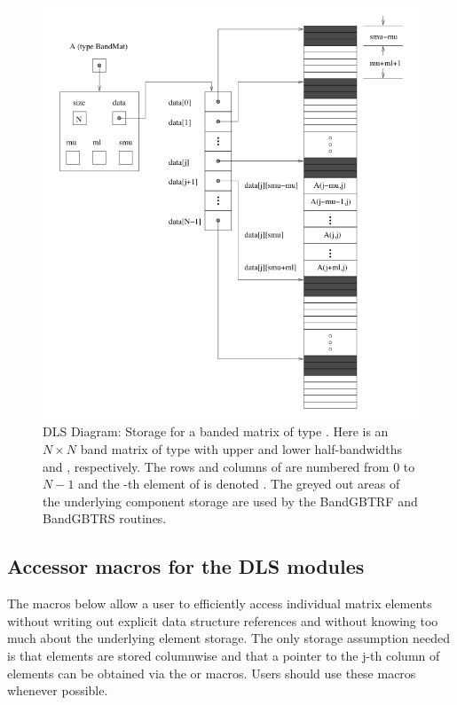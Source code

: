 \documentclass[letterpaper,10pt,english]{sphinxmanual}
\begin{document}
\begin{figure}[htbp]
\centering
\capstart

\includegraphics{dls_diagram.png}
\caption{DLS Diagram: Storage for a banded matrix of type {\hyperref[linear_solvers/DLS:DlsMat]{}}. Here
 is an $N \times N$ band matrix of type {\hyperref[linear_solvers/DLS:DlsMat]{}}
with upper and lower half-bandwidths  and ,
respectively. The rows and columns of  are numbered from
$0$ to $N-1$ and the -th element of  is
denoted . The greyed out areas of the underlying
component storage are used by the BandGBTRF and BandGBTRS routines.}\label{linear_solvers/DLS:dls-figure}\end{figure}


\subsection{Accessor macros for the DLS modules}
\label{linear_solvers/DLS:accessor-macros-for-the-dls-modules}
The macros below allow a user to efficiently access individual matrix
elements without writing out explicit data structure references and
without knowing too much about the underlying element storage.  The
only storage assumption needed is that elements are stored columnwise
and that a pointer to the j-th column of elements can be obtained via
the {\hyperref[linear_solvers/DLS:DENSE_COL]{}} or {\hyperref[linear_solvers/DLS:BAND_COL]{}} macros. Users should use these
macros whenever possible.
\end{document}
